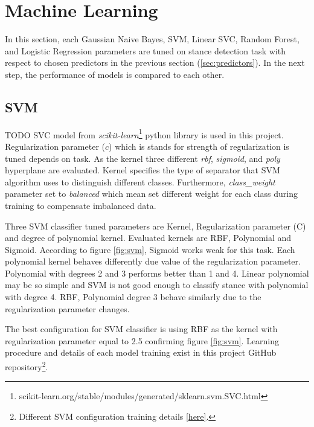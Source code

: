 \section{Machine Learning}
\label{sec:ml}
In this section, each Gaussian Naive Bayes, SVM, Linear SVC, Random Forest, and Logistic Regression parameters are tuned on stance detection task with respect to chosen predictors in the previous section (\ref{sec:predictors}). In the next step, the performance of models is compared to each other.

\subsection{SVM}
{\color{green}TODO}
SVC model from \textit{scikit-learn}\footnote{scikit-learn.org/stable/modules/generated/sklearn.svm.SVC.html} python library is used in this project. Regularization parameter ($ c $) which is stands for strength of regularization is tuned depends on task. As the kernel three different \textit{rbf}, \textit{sigmoid}, and \textit{poly} hyperplane are evaluated. Kernel specifies the type of separator that SVM algorithm uses to distinguish different classes. Furthermore, \textit{class\_weight} parameter set to \textit{balanced} which mean set different weight for each class during training to compensate imbalanced data. 

Three SVM classifier tuned parameters  are Kernel, Regularization parameter (C) and degree of polynomial kernel. Evaluated kernels are RBF, Polynomial and Sigmoid. According to figure \ref{fig:svm}, Sigmoid works weak for this task. Each polynomial kernel behaves differently due value of the regularization parameter. Polynomial with degrees 2 and 3 performs better than 1 and 4. Linear polynomial may be so simple and SVM is not good enough to classify stance with polynomial with degree 4. RBF, Polynomial degree 3 behave similarly due to the regularization parameter changes. 

The best configuration for SVM classifier is using RBF as the kernel with regularization parameter equal to 2.5 confirming figure \ref{fig:svm}. Learning procedure and details of each model training exist in this project GitHub repository\footnote{Different SVM configuration training details \href{https://github.com/mahsaghn/stance\_detection/tree/main/selected\_outputs/machinelearning/svm}{[here]}.}.

